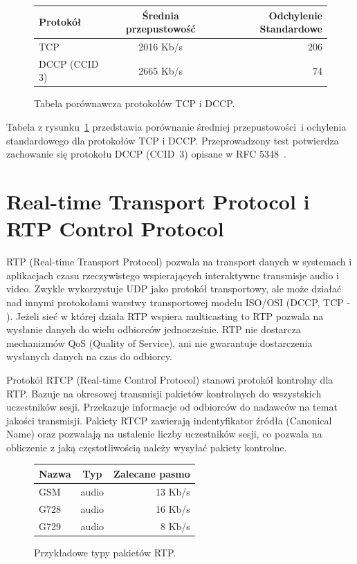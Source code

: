 \begin{figure}
	\centering
	\begin{tabular}{ l | c | r }
  		Protokół & Średnia przepustowość & Odchylenie Standardowe \\
  		\hline
  		TCP & 2016 Kb/s & 206 \\
  		DCCP (CCID 3) & 2665 Kb/s & 74 \\
	\end{tabular}
	\caption{Tabela porównawcza protokołów TCP i DCCP.}
	\label{TCP_DCCP_table}
\end{figure}

Tabela z rysunku~\ref{TCP_DCCP_table} przedstawia porównanie średniej przepustowości~i ochylenia standardowego dla protokołów TCP i DCCP. Przeprowadzony test potwierdza zachowanie się protokołu DCCP (CCID~3) opisane w RFC 5348~\cite{RFC5348}. 

\section{Real-time Transport Protocol i RTP Control Protocol}

RTP (Real-time Transport Protocol) pozwala na transport danych w systemach i aplikacjach czasu rzeczywistego wspierających interaktywne transmisje audio i video. Zwykle wykorzystuje UDP jako protokół transportowy, ale może działać nad innymi protokołami warstwy transportowej modelu ISO/OSI (DCCP, TCP - \cite{RFC3550, RFC5762}). Jeżeli sieć w której działa RTP wspiera multicasting to RTP pozwala na wysłanie danych do wielu odbiorców jednocześnie. RTP nie dostarcza mechanizmów QoS (Quality of Service), ani nie gwarantuje dostarczenia wysłanych danych na czas do odbiorcy.

Protokół RTCP (Real-time Control Protocol) stanowi protokół kontrolny dla RTP. Bazuje na okresowej transmisji pakietów kontrolnych do wszystskich uczestników sesji. Przekazuje informacje od odbiorców do nadawców na temat jakości transmisji. Pakiety RTCP zawierają indentyfikator źródła (Canonical Name) oraz pozwalają na ustalenie liczby uczestników sesji, co pozwala na obliczenie z jaką częstotliwością należy wysyłać pakiety kontrolne.

\begin{figure}[h!]
	\centering
	\begin{tabular}{ l | c | r }
  		Nazwa & Typ & Zalecane pasmo \\
  		\hline
  		GSM & audio & 13 Kb/s \\
  		G728 & audio & 16 Kb/s  \\
  		G729 & audio & 8 Kb/s  \\
	\end{tabular}
	\caption{Przykładowe typy pakietów RTP.}
	\label{RTP_table}
\end{figure}

